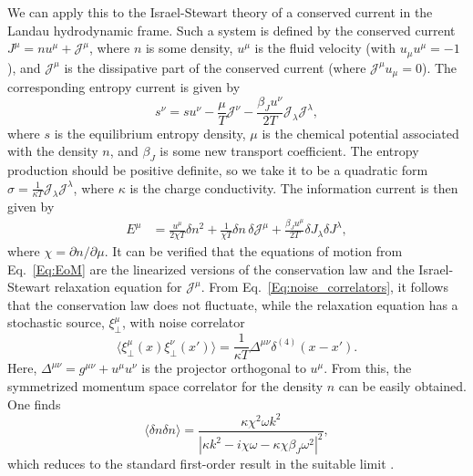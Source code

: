 \documentclass{webofc}
\begin{document}
We can apply this to the Israel-Stewart theory of a conserved current in the Landau hydrodynamic frame. Such a system is defined by the conserved current $J^{\mu} = n u^{\mu} + \mathcal{J}^{\mu}$, 
where $n$ is some density, $u^{\mu}$ is the fluid velocity (with $u_{\mu} u^{\mu} = -1$), and $\mathcal{J}^{\mu}$ is the dissipative part of the conserved current (where $\mathcal{J}^{\mu}u_\mu=0$). The corresponding entropy current is given by 
\begin{equation}
    s^{\nu} = s u^{\nu} - \frac{\mu}{T} \mathcal{J}^{\nu} - \frac{\beta_J u^{\nu}}{2T} \mathcal{J}_{\lambda} \mathcal{J}^{\lambda} ,
\end{equation}
where $s$ is the equilibrium entropy density, $\mu$ is the chemical potential associated with the density $n$, and $\beta_J$ is some new transport coefficient. The entropy production should be positive definite, so we take it to be a quadratic form $\sigma = \frac{1}{\kappa T} \mathcal{J}_{\lambda} \mathcal{J}^{\lambda}$, where $\kappa$ is the charge conductivity. The information current is then given by 
\begin{equation}
\begin{split}
    E^{\mu} & = \frac{u^{\mu}}{2\chi T} \delta n^2 + \frac{1}{\chi T} \delta n\, \delta \mathcal{J}^{\mu} + \frac{\beta_J u^{\mu}}{2T} \delta J_{\lambda} \delta J^{\lambda} ,
\end{split}
\end{equation}
where $\chi = \partial n / \partial \mu$. It can be verified that the equations of motion from Eq.\ \eqref{Eq:EoM} are the linearized versions of the conservation law and the Israel-Stewart relaxation equation for $\mathcal{J}^{\mu}$. From Eq.\ \eqref{Eq:noise_correlators}, it follows that the conservation law does not fluctuate, while the relaxation equation has a stochastic source, $\xi^{\mu}_{\perp}$, with noise correlator 
\begin{equation}
    \langle \xi^{\mu}_{\perp}(x) \xi^{\nu}_{\perp}(x') \rangle = \frac{1}{\kappa T} \Delta^{\mu\nu} \delta^{(4)}(x-x') .
\end{equation}
Here, $\Delta^{\mu\nu} = g^{\mu\nu} + u^{\mu} u^{\nu}$ is the projector orthogonal to $u^{\mu}$. From this, the symmetrized momentum space correlator for the density $n$ can be easily obtained. One finds
\begin{equation}
    \langle \delta n \delta n \rangle = \frac{\kappa \chi^2 \omega k^2}{|\kappa k^2 - i \chi \omega - \kappa \chi \beta_J \omega^2|^2} ,
\end{equation}
which reduces to the standard first-order result in the suitable limit \cite{Mullins:2023tjg}. 
\end{document}

